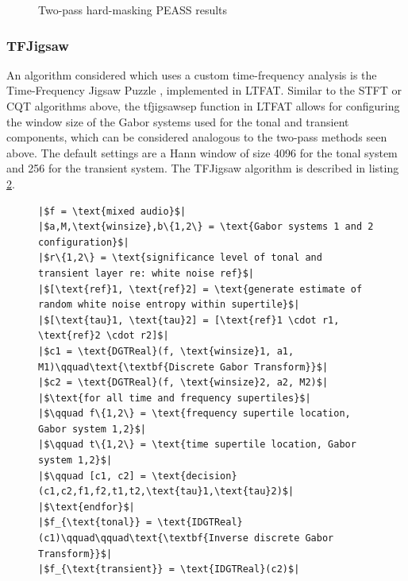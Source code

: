 \documentclass[letter,12pt]{article}
\newlength{\mintednumbersep}
\begin{document}
\begin{figure}[ht]
	\centering
	\caption{Two-pass hard-masking PEASS results}
	\label{fig:round2hard}
\end{figure}

\subsubsection{TFJigsaw}

An algorithm considered which uses a custom time-frequency analysis is the Time-Frequency Jigsaw Puzzle \cite{tfjigsaw}, implemented in LTFAT. Similar to the STFT or CQT algorithms above, the tfjigsawsep function in LTFAT allows for configuring the window size of the Gabor systems used for the tonal and transient components, which can be considered analogous to the two-pass methods seen above. The default settings are a Hann window of size 4096 for the tonal system and 256 for the transient system. The TFJigsaw algorithm is described in listing \ref{lst:tfjigsaw}.

\begin{figure}[h]
  \centering
\begin{verbatim}
|$f = \text{mixed audio}$|
|$a,M,\text{winsize},b\{1,2\} = \text{Gabor systems 1 and 2 configuration}$|
|$r\{1,2\} = \text{significance level of tonal and transient layer re: white noise ref}$|
|$[\text{ref}1, \text{ref}2] = \text{generate estimate of random white noise entropy within supertile}$|
|$[\text{tau}1, \text{tau}2] = [\text{ref}1 \cdot r1, \text{ref}2 \cdot r2]$|
|$c1 = \text{DGTReal}(f, \text{winsize}1, a1, M1)\qquad\text{\textbf{Discrete Gabor Transform}}$|
|$c2 = \text{DGTReal}(f, \text{winsize}2, a2, M2)$|
|$\text{for all time and frequency supertiles}$|
|$\qquad f\{1,2\} = \text{frequency supertile location, Gabor system 1,2}$|
|$\qquad t\{1,2\} = \text{time supertile location, Gabor system 1,2}$|
|$\qquad [c1, c2] = \text{decision}(c1,c2,f1,f2,t1,t2,\text{tau}1,\text{tau}2)$|
|$\text{endfor}$|
|$f_{\text{tonal}} = \text{IDGTReal}(c1)\qquad\qquad\text{\textbf{Inverse discrete Gabor Transform}}$|
|$f_{\text{transient}} = \text{IDGTReal}(c2)$|
\end{verbatim}
  \label{lst:tfjigsaw}
\end{figure}
\end{document}

